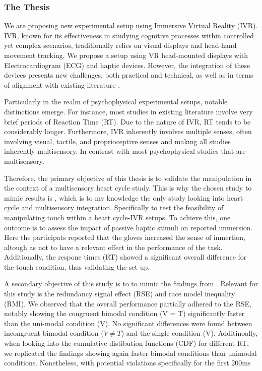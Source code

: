 \documentclass[12pt,oneside,openright]{report}
\begin{document}
\subsubsection*{The Thesis}

We are proposing new experimental setup using Immersive Virtual Reality (IVR). IVR, known for its effectiveness in studying cognitive processes within controlled yet complex scenarios, traditionally relies on visual displays and head-hand movement tracking. We propose a setup using VR head-mounted displays with Electrocardiogram (ECG) and haptic devices. However, the integration of these devices presents new challenges, both practical and technical, as well as in terms of alignment with existing literature \parencite{Klotzsche2023}.

Particularly in the realm of psychophysical experimental setups, notable distinctions emerge. For instance, most studies in existing literature involve very brief periods of Reaction Time (RT). Due to the nature of IVR, RT tends to be considerably longer. Furthermore, IVR inherently involves multiple senses,  often involving visual, tactile, and proprioceptive senses and making all studies inherently multisensory. In contrast with most psychophysical studies that are multisensory. 

Therefore, the primary objective of this thesis is to validate the manipulation in the context of a multisensory heart cycle study. This is why the chosen study to mimic results is \textcite{SALTAFOSSI2023108642}, which is to my knowledge the only study looking into heart cycle and multisensory integration. Specifically to test the feasibility of manipulating touch within a heart cycle-IVR setups. To achieve this, one outcome is to assess the impact of passive haptic stimuli on reported immersion. Here the participats reported that the gloves increased the sense of inmertion, altough as not to have a relevant effect in the performance of the task. Additionally, the respone times (RT) showed a significant overall difference for the touch condition, thus validating the set up.

A secondary objective of this study is to to mimic the findings from \textcite{SALTAFOSSI2023108642}. Relevant for this study is the redundancy signal effect (RSE) and race model inequality (RMI). We observed that the overall performance partially adhered to the RSE, notably showing the congruent bimodal condition (V = T) significantly faster than the uni-modal condition (V). No significant differences were found between incongruent bimodal condition ($V \neq T$) and the single condition (V). Additinoally, when looking into the cumulative distibution functions (CDF) for different RT, we replicated the findings showing again faster bimodal conditions than unimodal conditions. Nonetheless, with potential violations specifically for the first 200ms
\end{document}
